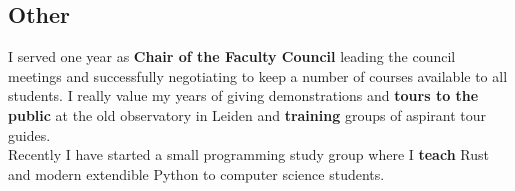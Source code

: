\subsection{Other}
I served one year as \textbf{Chair of the Faculty Council} leading the council meetings and successfully negotiating to keep a number of courses available to all students.
I really value my years of giving demonstrations and \textbf{tours to the public} at the old observatory in Leiden and \textbf{training} groups of aspirant tour guides.\\
\smallskip
Recently I have started a small programming study group where I \textbf{teach} Rust and modern extendible Python to computer science students.


